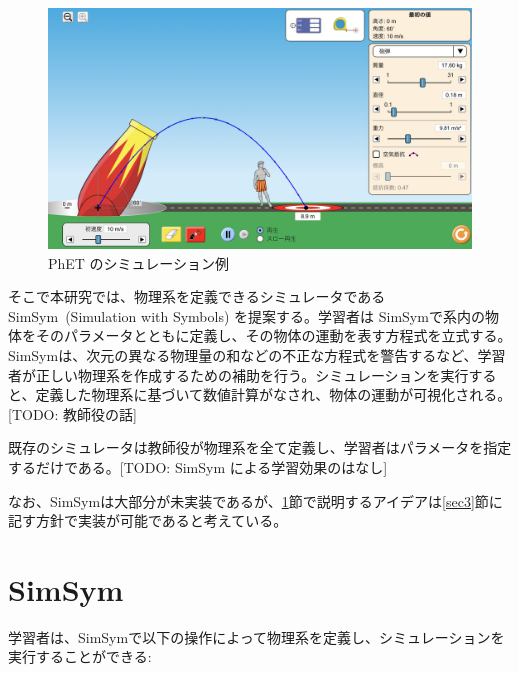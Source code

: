 \documentclass[11pt, a4paper, oneside, twocolumn, dvipdfmx]{jsarticle}
\newcommand{\simname}{SimSym}
\newcommand{\simnamealt}{Simulation with Symbols}
\begin{document}
\begin{figure}[thb]
\centering
\includegraphics*[width=0.9\linewidth]{figure/PhET_example.png}
\caption{PhET のシミュレーション例} \label{numeral_based}
\end{figure}

そこで本研究では、物理系を定義できるシミュレータである \simname~(\simnamealt) を提案する。学習者は \simname で系内の物体をそのパラメータとともに定義し、その物体の運動を表す方程式を立式する。\simname は、次元の異なる物理量の和などの不正な方程式を警告するなど、学習者が正しい物理系を作成するための補助を行う。シミュレーションを実行すると、定義した物理系に基づいて数値計算がなされ、物体の運動が可視化される。[TODO: 教師役の話]

既存のシミュレータは教師役が物理系を全て定義し、学習者はパラメータを指定するだけである。[TODO: SimSym による学習効果のはなし]


なお、\simname は大部分が未実装であるが、\ref{sec2}節で説明するアイデアは\ref{sec3}節に記す方針で実装が可能であると考えている。

\section{\simname} \label{sec2}

学習者は、\simname で以下の操作によって物理系を定義し、シミュレーションを実行することができる:
\end{document}
